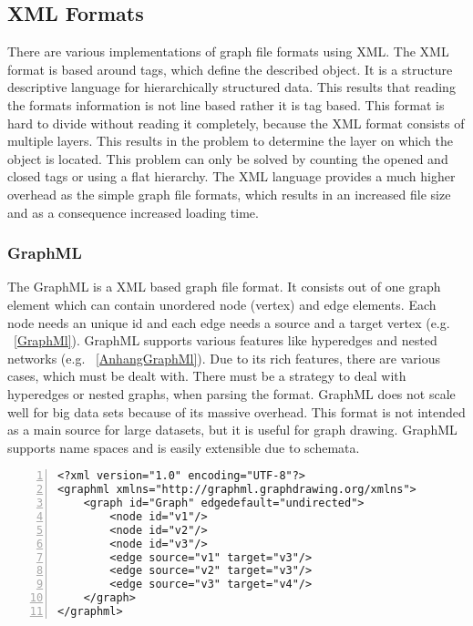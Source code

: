 \subsection{XML Formats}
There are various implementations of graph file formats using XML. The XML format is based around tags, which define the described object. It is a structure descriptive language for hierarchically structured data. This results that reading the formats information is not line based rather it is tag based. This format is hard to divide without reading it completely, because the XML format consists of multiple layers. This results in the problem to determine the layer on which the object is located. This problem can only be solved by counting the opened and closed tags or using a flat hierarchy\cite{bray1997extensible,Roughan.10.03.2015}.
The XML language provides a much higher overhead as the simple graph file formats, which results in an increased file size and as a consequence increased loading time.

\subsubsection{GraphML}
The GraphML is a XML based graph file format. It consists out of one graph element which can contain unordered node (vertex) and edge elements. Each node needs an unique id and each edge needs a source and a target vertex (e.g. ~\ref{GraphMl}). GraphML supports various features like hyperedges and nested networks (e.g. ~\ref{AnhangGraphMl}). Due to its rich features, there are various cases, which must be dealt with. There must be a strategy to deal with hyperedges or nested graphs, when parsing the format. GraphML does not scale well for big data sets because of its massive overhead. This format is not intended as a main source for large datasets, but it is useful for graph drawing. GraphML supports name spaces and is easily extensible due to schemata. \cite{brandes2013graph,kuhner2013graphml}
\vspace{-7mm}
\begin{center}
	\begin{minipage}{.8\textwidth}
		\begin{lstlisting}[numbers=left,
		stepnumber=1,caption={A Simple Graph in GraphML},captionpos=b, linewidth={\textwidth}, escapeinside=||,label=GraphMl]
<?xml version="1.0" encoding="UTF-8"?>
<graphml xmlns="http://graphml.graphdrawing.org/xmlns">
	<graph id="Graph" edgedefault="undirected">
		<node id="v1"/>
		<node id="v2"/>
		<node id="v3"/>
		<edge source="v1" target="v3"/>
		<edge source="v2" target="v3"/>
		<edge source="v3" target="v4"/>
	</graph>
</graphml>
		\end{lstlisting}
	\end{minipage}
\end{center}

